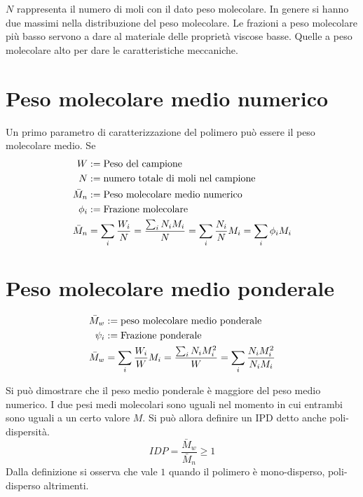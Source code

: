 $N$ rappresenta il numero di moli con il dato peso molecolare.
In genere si hanno due massimi nella distribuzione del peso molecolare.
Le frazioni a peso molecolare più basso servono a dare al materiale delle proprietà viscose basse.
Quelle a peso molecolare alto per dare le caratteristiche meccaniche.

\section{Peso molecolare medio numerico}
Un primo parametro di caratterizzazione del polimero può essere il peso molecolare medio.
Se 
\begin{equation}
\begin{split}
W &:= \textup{Peso del campione}\\
N &:= \textup{numero totale di moli nel campione}\\
\bar{M}_n &:= \textup{Peso molecolare medio numerico}\\
\phi_i &:= \textup{Frazione molecolare}\\
\bar{M}_n &= \sum_i{\frac{W_i}{N}} = \frac{\sum_i{N_iM_i}}{N} = \sum_i{\frac{N_i}{N}M_i} = \sum_i{\phi_iM_i}
\end{split}
\end{equation}  

\section{Peso molecolare medio ponderale}
\begin{equation}
\begin{split}
\bar{M}_w &:= \textup{peso molecolare medio ponderale}\\
\psi_i &:= \textup{Frazione ponderale}\\
\bar{M}_w &= \sum_i{\frac{W_i}{W}M_i} = \frac{\sum_i{N_iM_i^2}}{W} = \sum_i{\frac{N_iM_i^2}{N_iM_i}} 
\end{split}
\end{equation}

Si può dimostrare che il peso medio ponderale è maggiore del peso medio numerico.
I due pesi medi molecolari sono uguali nel momento in cui entrambi sono uguali a un certo valore $M$.
Si può allora definire un \ac{IPD} detto anche poli-dispersità.
\begin{equation}
IDP = \frac{\bar{M}_w}{\bar{M}_n} \geq 1
\label{eqn:IDP}
\end{equation}
Dalla definizione si osserva che vale $1$ quando il polimero è mono-disperso, poli-disperso altrimenti.

